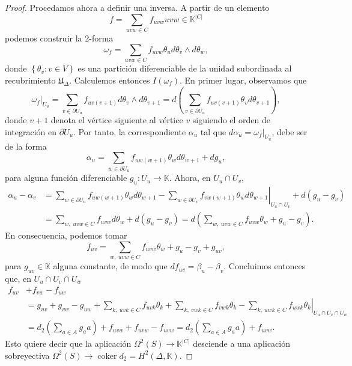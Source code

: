 \documentclass[12pt,a4paper]{article}
\theoremstyle{definition} \newtheorem{defn}[thm]{Definición}
\theoremstyle{definition} \newtheorem{ejemplo}[thm]{Ejemplo}
\theoremstyle{definition} \newtheorem{ejercicio}[thm]{Ejercicio}
\DeclareMathOperator{\coker}{coker}
\begin{document}
\begin{proof}
	Procedamos ahora a definir una inversa. A partir de un elemento $$f=\sum_{uvw \in C} f_{uvw} uvw \in \mathbb{K}^{|C|}$$ podemos construir la $2$-forma
	\begin{equation*}
	 \omega_f= \sum_{uvw \in C} f_{uvw} \theta_u d\theta_v \wedge d\theta_w,
	\end{equation*}
	donde $\left\{ \theta_v : v \in V \right\}$ es una partición diferenciable de la unidad subordinada al recubrimiento $\mathfrak{U}_\Delta$. Calculemos entonces $I(\omega_f)$. En primer lugar, observamos que 
	\begin{equation*}
	  \omega_f|_{U_u} = \sum_{v \in \partial U_u} f_{uv(v+1)} d\theta_v \wedge d\theta_{v+1} = d\left(\sum_{v \in \partial U_u} f_{uv(v+1)} \theta_v d\theta_{v+1}\right),
	\end{equation*}
	donde $v+1$ denota el vértice siguiente al vértice $v$ siguiendo el orden de integración en $\partial U_u$.
	Por tanto, la correspondiente $\alpha_u$ tal que $d\alpha_u=\omega_f|_{U_u}$, debe ser de la forma
	\begin{equation*}
	  \alpha_u = \sum_{w\in \partial U_u} f_{uw(w+1)} \theta_w d\theta_{w+1} + dg_u,
	\end{equation*}
	para alguna función diferenciable $g_u : U_u \rightarrow \mathbb{K}$. Ahora, en $U_{u} \cap U_{v}$,
	\begin{align*}
	  \alpha_{u} - \alpha_{v} &= \left.\sum_{w \in \partial U_{u}} f_{uw(w+1)} \theta_w d\theta_{w+1} -  \sum_{w \in \partial U_{v}} f_{vw(w+1)} \theta_w d\theta_{w+1} \right|_{U_{u} \cap U_{v}} + d(g_{u}-g_{v}) \\
	  & =  \sum_{w, \  uvw \in C} f_{uvw} d\theta_w + d(g_u - g_v) = d\left( \sum_{w, \  uvw \in C} f_{uvw} \theta_w + g_u -g_{v}\right) .
	\end{align*}
	En consecuencia, podemos tomar
	\begin{equation*}
	  f_{uv} = \sum_{w, \  uvw \in C} f_{uvw} \theta_w + g_u -g_{v} + g_{uv},
	\end{equation*}
	para $g_{uv} \in \mathbb{K}$ alguna constante, de modo que $df_{uv}=\beta_u - \beta_v$. Concluimos entonces que, en $U_{u} \cap U_{v} \cap U_{w}$
	\begin{align*}
	  f_{uv} &+ f_{vw}  - f_{uw} \\ &= g_{uv} + g_{vw} - g_{uw} + \left. \sum_{k, \  uvk \in C} f_{uvk} \theta_k + \sum_{k, \  vwk \in C} f_{vwk} \theta_k - \sum_{k, \  uwk \in C} f_{uwk} \theta_k \right|_{U_{u} \cap U_{v} \cap U_{w}} \\ & = d_2\left( \sum_{a \in A} g_{a} a\right) + f_{uvw} + f_{uvw} - f_{uvw}= d_2\left( \sum_{a \in A} g_{a} a\right)+f_{uvw} .
	\end{align*}
	Esto quiere decir que la aplicación $\Omega^2(S) \rightarrow \mathbb{K}^{|C|}$ desciende a una aplicación sobreyectiva $\Omega^2(S) \rightarrow \coker d_2 = H^2(\Delta, \mathbb{K})$.
	

\end{proof}
\end{document}
